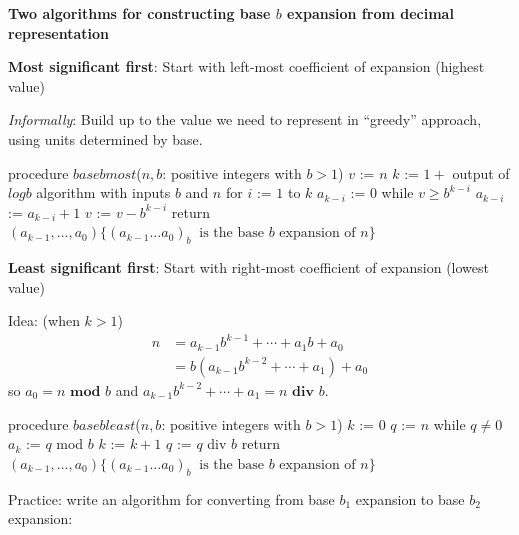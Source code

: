 \documentclass[12pt, oneside]{article}
\begin{document}
\newpage 

{\bf Two algorithms for constructing base $b$ expansion from decimal representation}

{\bf Most significant first}: Start with left-most coefficient of expansion (highest value)

{\it Informally}: Build up to the value we need to represent in ``greedy'' approach, using 
units determined by base.

\vfill




\begin{algorithm}[caption={Calculating base $b$ expansion, from left}]
procedure $\textit{basebmost}$($n, b$: positive integers with $b > 1$)
$v$ := $n$
$k$ := $1 + $ output of $logb$ algorithm with inputs $b$ and $n$
for $i$ := $1$ to $k$
  $a_{k-i}$ := $0$
  while $v \geq b^{k-i}$
    $a_{k-i}$ := $a_{k-i} + 1$
    $v$ := $v -  b^{k-i}$
return $(a_{k-1}, \ldots, a_0) \{(a_{k-1} \ldots a_0)_b~\textrm{ is the base } b \textrm{ expansion of } n \}$
\end{algorithm}
 


\vfill
\vfill

\newpage
{\bf Least significant first}: Start with right-most coefficient of expansion (lowest value)

Idea: {\tiny(when $k > 1$)} 
    \begin{align*}
      n &= a_{k-1} b^{k-1} + \cdots + a_1 b + a_0 \\
        &= b ( a_{k-1} b^{k-2} + \cdots + a_1) + a_0\end{align*}
    so $a_0 = n \textbf{ mod } b$ and $a_{k-1} b^{k-2} + \cdots + a_1 = n \textbf{ div } b$.




\begin{algorithm}[caption={Calculating base $b$ expansion, from right}]
procedure $\textit{basebleast}$($n, b$: positive integers with $b > 1$)
$k$ := $0$
$q$ := $n$
while $q  \neq 0$
  $a_{k}$ := $q$ mod $b$
  $k$ := $k+1$
  $q$ := $q$ div $b$
return $(a_{k-1}, \ldots, a_0) \{(a_{k-1} \ldots a_0)_b~\textrm{ is the base } b \textrm{ expansion of } n \}$
\end{algorithm}
 



\vfill
\vfill
\newpage 



Practice: write an algorithm for converting from base $b_1$ expansion to base $b_2$ expansion:
\end{document}

